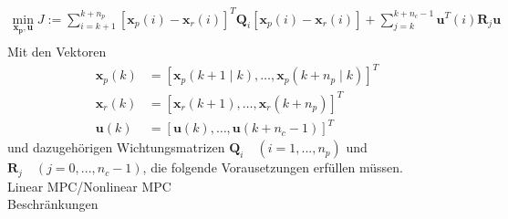 \begin{align*}
	\underset{\boldsymbol{x_p, u}}{\text{min}}\;J:=\sum_{i=k+1}^{k+n_p} \left [\boldsymbol{x}_{p}(i)-\boldsymbol{x}_{r}(i)\right ]^T\boldsymbol{Q}_i\left [\boldsymbol{x}_{p}(i)-\boldsymbol{x}_{r}(i)\right ] +\sum_{j=k}^{k+n_c-1} \boldsymbol{u}^T(i)\boldsymbol{R}_j\boldsymbol{u}\\
\end{align*}
Mit den Vektoren
\begin{align*}
	\boldsymbol{x}_p(k)&=\left [ \boldsymbol{x}_p(k+1\mid k),\dots,\boldsymbol{x}_p(k+n_p\mid k) \right ]^T\\
	\boldsymbol{x}_r(k)&=\left [ \boldsymbol{x}_r(k+1),\dots,\boldsymbol{x}_r(k+n_p) \right ]^T\\
	\boldsymbol{u}(k)&=\left [ \boldsymbol{u}(k),\dots,\boldsymbol{u}(k+n_c-1) \right ]^T
\end{align*}
und dazugehörigen Wichtungsmatrizen $\boldsymbol{Q}_i\quad(i=1, ...,n_p)$ und $\boldsymbol{R}_j\quad(j=0, ...,n_c-1)$, die folgende Vorausetzungen erfüllen müssen.\\
Linear MPC/Nonlinear MPC\\
Beschränkungen
